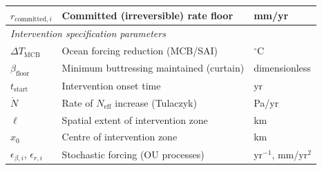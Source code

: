 \documentclass[11pt]{article}
\theoremstyle{definition}
\begin{document}
\begin{center}
\begin{tabular}{lll}
  $r_{\text{committed},i}$ & Committed (irreversible) rate floor & mm/yr \\
  \midrule
  \multicolumn{3}{l}{\textit{Intervention specification parameters}} \\
  \midrule
  $\Delta T_{\text{MCB}}$ & Ocean forcing reduction (MCB/SAI) & ${}^\circ$C \\
  $\beta_{\text{floor}}$ & Minimum buttressing maintained (curtain) & dimensionless \\
  $t_{\text{start}}$ & Intervention onset time & yr \\
  $\dot{N}$ & Rate of $N_{\text{eff}}$ increase (Tulaczyk) & Pa/yr \\
  $\ell$ & Spatial extent of intervention zone & km \\
  $x_0$ & Centre of intervention zone & km \\
  $\epsilon_{\beta,i}$, $\epsilon_{r,i}$ & Stochastic forcing (OU processes) & yr$^{-1}$, mm/yr$^2$ \\
  \bottomrule
\end{tabular}
\end{center}


\end{document}
